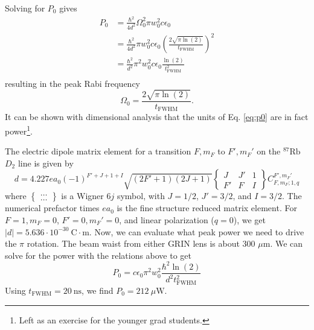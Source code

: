Solving for $P_0$ gives
\begin{equation}\label{eq:p0}
\begin{split}
P_0 & = \frac{\hbar^2}{4d^2}\Omega_0^2\pi w_0^2 c \epsilon_0 \\
 & = \frac{\hbar^2}{4d^2} \pi w_0^2 c \epsilon_0 \left(\frac{2\sqrt{\pi \ln(2)}}{t_{\textrm{FWHM}}}\right)^2 \\
 & = \frac{\hbar^2}{d^2} \pi^2 w_0^2 c \epsilon_0\frac{\ln(2)}{t_{\textrm{FWHM}}^2} \\
\end{split}
\end{equation}
resulting in the peak Rabi frequency
\begin{equation}\label{eq:omega0}
    \Omega_0=\frac{2\sqrt{\pi \ln(2)}}{t_{\textrm{FWHM}}}.
\end{equation}
It can be shown with dimensional analysis that the units of Eq. \ref{eq:p0} are in fact power\footnote{Left as an exercise for the younger grad students.}.

The electric dipole matrix element for a transition $F,m_F$ to $F',m_F'$ on the $^{87}\textrm {Rb}$  $D_2$ line is given by
\begin{equation}d=4.227 e a_0 (-1)^{F'+J+1+I} \sqrt{(2 F'+1)(2 J+1)}\left\{\begin{array}{ccc}
J & J' & 1 \\
F' & F & I
\end{array}\right\}C_{F,m_F;1,q}^{F',m_F'}
\end{equation}
where $\left\{ \begin{array}{c} \dots \\ \dots \end{array} \right\}$ is a Wigner $6j$ symbol, with $J=1/2$, $J'=3/2$, and $I=3/2$. The numerical prefactor times $e a_0$ is the fine structure reduced matrix element.
For $F=1, m_F=0$,  $F'=0, m_F'=0$, and linear polarization ($q=0$), we get
$|d|=5.636 \cdot 10^{-30} ~\textrm{C}\cdot\textrm{m}$.
Now, we can evaluate what peak power we need to drive the $\pi$ rotation. The beam waist from either GRIN lens is about 300 $\mu \textrm{m}$. We can solve for the power with the relations above to get
\begin{equation}
    P_0 = c \epsilon_0 \pi^2 w_0^2 \frac{\hbar^2 \ln(2)}{d^2 t_{\textrm{FWHM}}^2}
\end{equation}
Using $t_{\textrm{FWHM}}=20~ \textrm{ns}$, we find $P_0 = 212~\mu \textrm{W}$.

